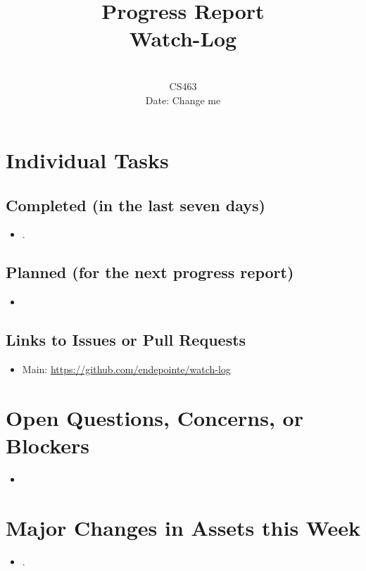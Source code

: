 \documentclass{article}
\title{Progress Report\\[0.5em]
\large Watch-Log}
\author{\\
CS463\\
Date: Change me}
\date{}
\begin{document}
\maketitle

\section*{Individual Tasks}
\subsection*{Completed (in the last seven days)}
\begin{itemize}
    \item .
\end{itemize}

\subsection*{Planned (for the next progress report)}
\begin{itemize}
    \item
\end{itemize}

\subsection*{Links to Issues or Pull Requests}
\begin{itemize}
    \item Main: \underline{\url{https://github.com/endepointe/watch-log}}
\end{itemize}

\section*{Open Questions, Concerns, or Blockers}
\begin{itemize}
    \item
\end{itemize}

\section*{Major Changes in Assets this Week}
\begin{itemize}
    \item.
\end{itemize}
\end{document}
